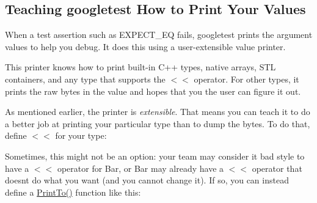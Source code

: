 \subsection*{Teaching googletest How to Print Your Values}

When a test assertion such as {\ttfamily E\+X\+P\+E\+C\+T\+\_\+\+EQ} fails, googletest prints the argument values to help you debug. It does this using a user-\/extensible value printer.

This printer knows how to print built-\/in C++ types, native arrays, S\+TL containers, and any type that supports the {\ttfamily $<$$<$} operator. For other types, it prints the raw bytes in the value and hopes that you the user can figure it out.

As mentioned earlier, the printer is {\itshape extensible}. That means you can teach it to do a better job at printing your particular type than to dump the bytes. To do that, define {\ttfamily $<$$<$} for your type\+:


\begin{DoxyCode}{0}
\DoxyCodeLine{}
\DoxyCodeLine{}
\DoxyCodeLine{  \}}
\DoxyCodeLine{\};}
\DoxyCodeLine{}
\DoxyCodeLine{\}}
\DoxyCodeLine{}
\end{DoxyCode}


Sometimes, this might not be an option\+: your team may consider it bad style to have a {\ttfamily $<$$<$} operator for {\ttfamily Bar}, or {\ttfamily Bar} may already have a {\ttfamily $<$$<$} operator that doesn\textquotesingle{}t do what you want (and you cannot change it). If so, you can instead define a {\ttfamily \mbox{\hyperlink{namespacetesting_1_1internal_a8fd10cc30084c36a89c74868c8bd53f8}{Print\+To()}}} function like this\+:


